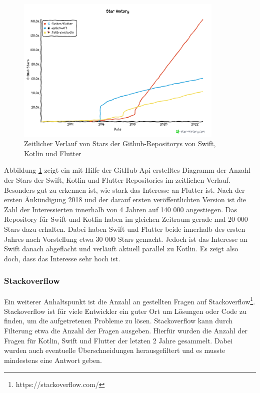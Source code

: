 \begin{figure}[ht]
  \centering
  \includegraphics[height=7cm,keepaspectratio]{images/star-history_programming languages.png} 
  \caption[Zeitlicher Verlauf von Stars der Github-Repositorys von Swift, Kotlin und Flutter]{Zeitlicher Verlauf von Stars der Github-Repositorys von Swift, Kotlin und Flutter\protect\footnotemark }
  \label{fig:star_history}
\end{figure}


Abbildung \ref{fig:star_history} zeigt ein mit Hilfe der GitHub-Api erstelltes Diagramm der Anzahl der Stars der Swift, Kotlin und Flutter Repositories im zeitlichen Verlauf. 
Besonders gut zu erkennen ist, wie stark das Interesse an Flutter ist. Nach der ersten Änkündigung 2018 und der darauf ersten veröffentlichten Version ist die Zahl der Interessierten innerhalb von 4 Jahren auf 140 000 angestiegen. Das Repository für Swift und Kotlin haben im gleichen Zeitraum gerade mal 20 000 Stars dazu erhalten. Dabei haben Swift und Flutter beide innerhalb des ersten Jahres nach Vorstellung etwa 30 000 Stars gemacht. Jedoch ist das Interesse an Swift danach abgeflacht und verläuft aktuell parallel zu Kotlin. Es zeigt also doch, dass das Interesse sehr hoch ist.

\subsubsection{Stackoverflow}
Ein weiterer Anhaltspunkt ist die Anzahl an gestellten Fragen auf Stackoverflow\footnote{https://stackoverflow.com/}. Stackoverflow ist für viele Entwickler ein guter Ort um Lösungen oder Code zu finden, um die aufgetretenen Probleme zu lösen. Stackoverflow kann durch Filterung etwa die Anzahl der Fragen ausgeben. Hierfür wurden die Anzahl der Fragen für Kotlin, Swift und Flutter der letzten 2 Jahre gesammelt. Dabei wurden auch eventuelle Überschneidungen herausgefiltert und es musste mindestens eine Antwort geben.

